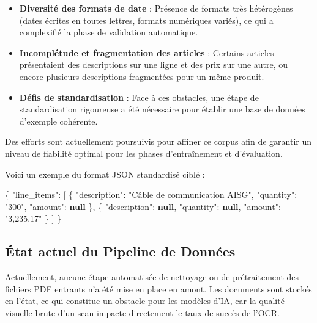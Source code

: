 \documentclass[
  letterpaper,
  DIV=11,
  numbers=noendperiod]{scrartcl}
\newenvironment{Shaded}{\begin{snugshade}}{\end{snugshade}}
\newcommand{\DataTypeTok}[1]{\textcolor[rgb]{0.68,0.00,0.00}{#1}}
\newcommand{\FunctionTok}[1]{\textcolor[rgb]{0.28,0.35,0.67}{#1}}
\newcommand{\KeywordTok}[1]{\textcolor[rgb]{0.00,0.23,0.31}{\textbf{#1}}}
\newcommand{\OtherTok}[1]{\textcolor[rgb]{0.00,0.23,0.31}{#1}}
\newcommand{\StringTok}[1]{\textcolor[rgb]{0.13,0.47,0.30}{#1}}
\providecommand{\tightlist}{%
  \setlength{\itemsep}{0pt}\setlength{\parskip}{0pt}}
\begin{document}
\begin{itemize}
\tightlist
\item
  \textbf{Diversité des formats de date} : Présence de formats très
  hétérogènes (dates écrites en toutes lettres, formats numériques
  variés), ce qui a complexifié la phase de validation automatique.
\item
  \textbf{Incomplétude et fragmentation des articles} : Certains
  articles présentaient des descriptions sur une ligne et des prix sur
  une autre, ou encore plusieurs descriptions fragmentées pour un même
  produit.
\item
  \textbf{Défis de standardisation} : Face à ces obstacles, une étape de
  standardisation rigoureuse a été nécessaire pour établir une base de
  données d'exemple cohérente.
\end{itemize}

Des efforts sont actuellement poursuivis pour affiner ce corpus afin de
garantir un niveau de fiabilité optimal pour les phases d'entraînement
et d'évaluation.

Voici un exemple du format JSON standardisé ciblé :

\begin{Shaded}
\begin{Highlighting}[]
\FunctionTok{\{}
  \DataTypeTok{"line\_items"}\FunctionTok{:} \OtherTok{[}
    \FunctionTok{\{}
      \DataTypeTok{"description"}\FunctionTok{:} \StringTok{"Câble de communication AISG"}\FunctionTok{,}
      \DataTypeTok{"quantity"}\FunctionTok{:} \StringTok{"300"}\FunctionTok{,}
      \DataTypeTok{"amount"}\FunctionTok{:} \KeywordTok{null} 
    \FunctionTok{\}}\OtherTok{,}
    \FunctionTok{\{}
      \DataTypeTok{"description"}\FunctionTok{:} \KeywordTok{null}\FunctionTok{,}
      \DataTypeTok{"quantity"}\FunctionTok{:} \KeywordTok{null}\FunctionTok{,}
      \DataTypeTok{"amount"}\FunctionTok{:} \StringTok{"3,235.17"}
    \FunctionTok{\}}
  \OtherTok{]}
\FunctionTok{\}}
\end{Highlighting}
\end{Shaded}

\subsection{État actuel du Pipeline de
Données}\label{uxe9tat-actuel-du-pipeline-de-donnuxe9es}

Actuellement, aucune étape automatisée de nettoyage ou de prétraitement
des fichiers PDF entrants n'a été mise en place en amont. Les documents
sont stockés en l'état, ce qui constitue un obstacle pour les modèles
d'IA, car la qualité visuelle brute d'un scan impacte directement le
taux de succès de l'OCR.
\end{document}
